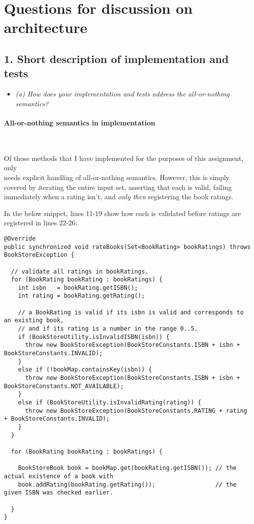 \section{Questions for discussion on architecture}

\subsection{1. Short description of implementation and tests}

\begin{itemize}
    \item \textit{(a) How does your implementation and tests address the all-or-nothing semantics?}
\end{itemize}

\paragraph{All-or-nothing semantics in implementation}~\smallskip

\noindent Of those methods that I have implemented for the purposes of this assignment,
only\\  needs explicit handling of all-or-nothing
semantics. However, this is simply covered by iterating the entire input
 set, asserting that each  is valid, failing
immediately when a rating isn't, and \textit{only then} registering the book
ratings. \medskip

In the below snippet, lines 11-19 show how each  is validated
before ratings are registered in lines 22-26:


\begin{verbatim}
@Override
public synchronized void rateBooks(Set<BookRating> bookRatings) throws BookStoreException {

  // validate all ratings in bookRatings.
  for (BookRating bookRating : bookRatings) {
    int isbn   = bookRating.getISBN();
    int rating = bookRating.getRating();

    // a BookRating is valid if its isbn is valid and corresponds to an existing book,
    // and if its rating is a number in the range 0..5.
    if (BookStoreUtility.isInvalidISBN(isbn)) {
      throw new BookStoreException(BookStoreConstants.ISBN + isbn + BookStoreConstants.INVALID);
    }
    else if (!bookMap.containsKey(isbn)) {
      throw new BookStoreException(BookStoreConstants.ISBN + isbn + BookStoreConstants.NOT_AVAILABLE);
    }
    else if (BookStoreUtility.isInvalidRating(rating)) {
      throw new BookStoreException(BookStoreConstants.RATING + rating + BookStoreConstants.INVALID);
    }
  }

  for (BookRating bookRating : bookRatings) {

    BookStoreBook book = bookMap.get(bookRating.getISBN()); // the actual existence of a book with
    book.addRating(bookRating.getRating());                 // the given ISBN was checked earlier.

  }
}
\end{verbatim}

